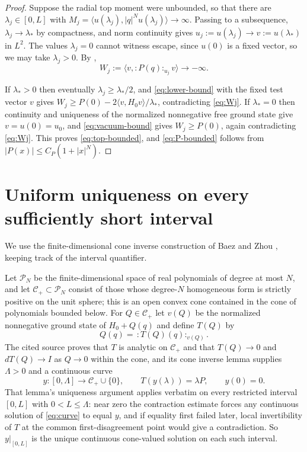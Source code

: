 \documentclass[11pt,reqno]{amsart}
\theoremstyle{plain}
\theoremstyle{definition}
\theoremstyle{remark}
\numberwithin{equation}{section}
\begin{document}
\begin{proof}
  Suppose the radial top moment were unbounded, so that there are
  $\lambda_j\in[0,L]$ with
  $M_j=\langle u(\lambda_j),|q|^Nu(\lambda_j)\rangle\to\infty$. Passing to a
  subsequence, $\lambda_j\to\lambda_*$ by compactness, and norm continuity
  gives $u_j:=u(\lambda_j)\to v:=u(\lambda_*)$ in $L^2$. The values
  $\lambda_j=0$ cannot witness escape, since $u(0)$ is a fixed vector, so we
  may take $\lambda_j>0$. By ,
  \begin{equation}
    \label{eq:Wj}
    W_j:=\langle v,:P(q):_{u_j}v\rangle\longrightarrow-\infty .
  \end{equation}

  If $\lambda_*>0$ then eventually $\lambda_j\ge\lambda_*/2$, and
  \eqref{eq:lower-bound} with the fixed test vector $v$ gives
  $W_j\ge P(0)-2\langle v,H_0v\rangle/\lambda_*$, contradicting
  \eqref{eq:Wj}. If $\lambda_*=0$ then continuity and uniqueness of the
  normalized nonnegative free ground state give $v=u(0)=u_0$, and
  \eqref{eq:vacuum-bound} gives $W_j\ge P(0)$, again contradicting
  \eqref{eq:Wj}. This proves \eqref{eq:top-bounded}, and
  \eqref{eq:P-bounded} follows from $|P(x)|\le C_P(1+|x|^N)$.
\end{proof}

\section{Uniform uniqueness on every sufficiently short interval}
\label{sec:uniqueness}

We use the finite-dimensional cone inverse construction of Baez and Zhou
\cite[Theorem 1 and Lemmas 8--9]{BaezZhou1992}, keeping track
of the interval quantifier.

Let $\mathcal P_N$ be the finite-dimensional space of real polynomials of
degree at most $N$, and let $\mathcal C_+\subset\mathcal P_N$ consist of
those whose degree-$N$ homogeneous form is strictly positive on the unit
sphere; this is an open convex cone contained in the cone of polynomials
bounded below. For $Q\in\mathcal C_+$ let $v(Q)$ be the normalized
nonnegative ground state of $H_0+Q(q)$ and define $T(Q)$ by
\begin{equation}
  \label{eq:T}
  Q(q)=\,:T(Q)(q):_{v(Q)} .
\end{equation}
The cited source proves that $T$ is analytic on $\mathcal C_+$ and that
$T(Q)\to0$ and $dT(Q)\to I$ as $Q\to0$ within the cone, and its cone inverse
lemma supplies $\Lambda>0$ and a continuous curve
\begin{equation}
  \label{eq:curve}
  y:[0,\Lambda]\to\mathcal C_+\cup\{0\},
  \qquad
  T(y(\lambda))=\lambda P,
  \qquad
  y(0)=0 .
\end{equation}
That lemma's uniqueness argument applies verbatim on every restricted
interval $[0,L]$ with $0<L\le\Lambda$: near zero the contraction estimate
forces any continuous solution of \eqref{eq:curve} to equal $y$, and if
equality first failed later, local invertibility of $T$ at the common
first-disagreement point would give a contradiction. So $y|_{[0,L]}$ is the
unique continuous cone-valued solution on each such interval.
\end{document}
